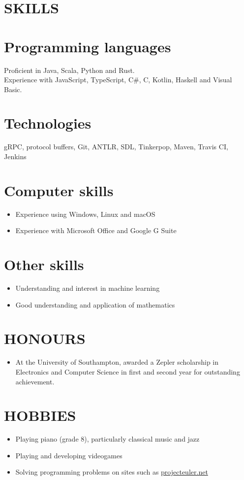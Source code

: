 \documentclass[margin]{res}
\begin{document}
\begin{resume}
\section{SKILLS}

\normalsize{\section{Programming languages}}
Proficient in Java, Scala, Python and Rust. \\
Experience with JavaScript, TypeScript, C\#, C, Kotlin, Haskell and Visual Basic.

\normalsize{\section{Technologies}}
gRPC, protocol buffers, Git, ANTLR, SDL, Tinkerpop, Maven, Travis CI, Jenkins

\normalsize{\section{Computer skills}}
\begin{itemize}
\item Experience using Windows, Linux and macOS
\item Experience with Microsoft Office and Google G Suite
\end{itemize}

\normalsize{\section{Other skills}}
\begin{itemize}
\item Understanding and interest in machine learning
\item Good understanding and application of mathematics
\end{itemize}

\section{HONOURS}
\begin{itemize}
\item At the University of Southampton, awarded a Zepler scholarship in
Electronics and Computer Science in first and second year for outstanding
achievement.
\end{itemize}

\section{HOBBIES}
\begin{itemize}
\item Playing piano (grade 8), particularly classical music and jazz
\item Playing and developing videogames
\item Solving programming problems on sites such as
\href{https://projecteuler.net/}{projecteuler.net}
\end{itemize}

\end{resume}
\end{document}
